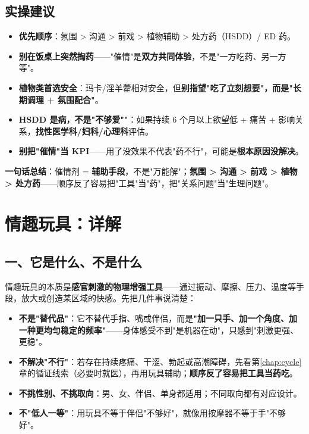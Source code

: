 \documentclass[12pt,UTF8,openany]{ctexbook}
\begin{document}
\subsection*{实操建议}
\begin{itemize}[leftmargin=2em,itemsep=0.3em]
  \item \textbf{优先顺序}：氛围 > 沟通 > 前戏 > 植物辅助 > 处方药（HSDD）/ ED 药。
  \item \textbf{别在饭桌上突然掏药}——"催情"是\textbf{双方共同体验}，不是"一方吃药、另一方等"。
  \item \textbf{植物类首选安全}：玛卡/淫羊藿相对安全，但\textbf{别指望"吃了立刻想要"，而是"长期调理 + 氛围配合"}。
  \item \textbf{HSDD 是病，不是"不够爱""}：如果持续 6 个月以上欲望低 + 痛苦 + 影响关系，\textbf{找性医学科/妇科/心理科}评估。
  \item \textbf{别把"催情"当 KPI}——用了没效果不代表"药不行"，可能是\textbf{根本原因没解决}。
\end{itemize}

\noindent\textbf{一句话总结}：催情剂 = \textbf{辅助手段}，不是"万能解"；\textbf{氛围 > 沟通 > 前戏 > 植物 > 处方药}——顺序反了容易把"工具"当"药"，把"关系问题"当"生理问题"。

\section{情趣玩具：详解}

\subsection*{一、它是什么、不是什么}
情趣玩具的本质是\textbf{感官刺激的物理增强工具}——通过振动、摩擦、压力、温度等手段，放大或创造某区域的快感。先把几件事说清楚：
\begin{itemize}[leftmargin=2em,itemsep=0.3em]
  \item \textbf{不是"替代品"}：它不替代手指、嘴或伴侣，而是\textbf{"加一只手、加一个角度、加一种更均匀稳定的频率"}——身体感受不到"是机器在动"，只感到"刺激更强、更稳"。
  \item \textbf{不解决"不行"}：若存在持续疼痛、干涩、勃起或高潮障碍，先看第\ref{chap:cycle}章的循证线索（必要时就医），再用玩具辅助；\textbf{顺序反了容易把工具当药吃}。
  \item \textbf{不挑性别、不挑取向}：男、女、伴侣、单身都适用；不同取向都有对应设计。
  \item \textbf{不"低人一等"}：用玩具不等于伴侣"不够好"，就像用按摩器不等于手"不够好"。
\end{itemize}
\end{document}
